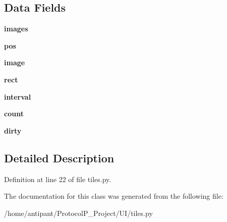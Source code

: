 \subsection*{Data Fields}
\begin{DoxyCompactItemize}
\item 
\hypertarget{classtiles_1_1AnimatedSprite_a532824d1725cfad4915d90c0eb5ceff0}{{\bfseries images}}\label{classtiles_1_1AnimatedSprite_a532824d1725cfad4915d90c0eb5ceff0}

\item 
\hypertarget{classtiles_1_1AnimatedSprite_a406749ec32f3d5406834948b79126332}{{\bfseries pos}}\label{classtiles_1_1AnimatedSprite_a406749ec32f3d5406834948b79126332}

\item 
\hypertarget{classtiles_1_1AnimatedSprite_ae80c4f033f04b8d7e32b61687892ce8e}{{\bfseries image}}\label{classtiles_1_1AnimatedSprite_ae80c4f033f04b8d7e32b61687892ce8e}

\item 
\hypertarget{classtiles_1_1AnimatedSprite_a8fecf17b5f1209c90035ff657d34ffb9}{{\bfseries rect}}\label{classtiles_1_1AnimatedSprite_a8fecf17b5f1209c90035ff657d34ffb9}

\item 
\hypertarget{classtiles_1_1AnimatedSprite_ae3ffcfa7a7f73aad07204fefda10b75b}{{\bfseries interval}}\label{classtiles_1_1AnimatedSprite_ae3ffcfa7a7f73aad07204fefda10b75b}

\item 
\hypertarget{classtiles_1_1AnimatedSprite_ac7f688c68e2fea34d53ccb57b81cb69e}{{\bfseries count}}\label{classtiles_1_1AnimatedSprite_ac7f688c68e2fea34d53ccb57b81cb69e}

\item 
\hypertarget{classtiles_1_1AnimatedSprite_ad3e171f6a1ec19006c0824eee5cc1db0}{{\bfseries dirty}}\label{classtiles_1_1AnimatedSprite_ad3e171f6a1ec19006c0824eee5cc1db0}

\end{DoxyCompactItemize}


\subsection{Detailed Description}


Definition at line 22 of file tiles.\-py.



The documentation for this class was generated from the following file\-:\begin{DoxyCompactItemize}
\item 
/home/antipant/\-Protocol\-P\-\_\-\-Project/\-U\-I/tiles.\-py\end{DoxyCompactItemize}
